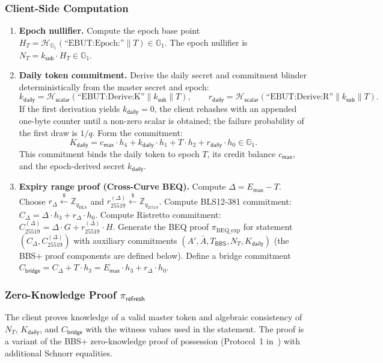 \documentclass[11pt]{article}
\theoremstyle{definitionstyle}
\theoremstyle{plain}
\begin{document}
\subsubsection{Client-Side Computation}
\begin{enumerate}[leftmargin=*]
\item \textbf{Epoch nullifier.}
  Compute the epoch base point $H_T = \mathcal{H}_{\mathbb{G}_1}(\text{``EBUT:Epoch:''} \parallel T) \in \mathbb{G}_1$.
  The epoch nullifier is $N_T = k_{\mathsf{sub}} \cdot H_T \in \mathbb{G}_1$.
\item \textbf{Daily token commitment.}
  Derive the daily secret and commitment blinder deterministically from the master secret and epoch:
  \[
  k_{\mathsf{daily}} = \mathcal{H}_{\mathsf{scalar}}(\text{``EBUT:Derive:K''} \parallel k_{\mathsf{sub}} \parallel T),
  \qquad
  r_{\mathsf{daily}} = \mathcal{H}_{\mathsf{scalar}}(\text{``EBUT:Derive:R''} \parallel k_{\mathsf{sub}} \parallel T).
  \]
  If the first derivation yields $k_{\mathsf{daily}}=0$, the client rehashes with an appended one-byte counter until a non-zero scalar is obtained; the failure probability of the first draw is $1/q$. Form the commitment:
  \[
  K_{\mathsf{daily}} = c_{\mathsf{max}} \cdot h_4 + k_{\mathsf{daily}} \cdot h_1 + T \cdot h_2 + r_{\mathsf{daily}} \cdot h_0 \in \mathbb{G}_1.
  \]
  This commitment binds the daily token to epoch $T$, its credit balance $c_{\mathsf{max}}$, and the epoch-derived secret $k_{\mathsf{daily}}$.

\item \textbf{Expiry range proof (Cross-Curve BEQ).}
  Compute $\Delta = E_{\mathsf{max}} - T$.
  Choose $r_{\Delta} \xleftarrow{\$} \mathbb{Z}_{q_{\text{BLS}}}$ and $r_{25519}^{(\Delta)} \xleftarrow{\$} \mathbb{Z}_{q_{25519}}$.
  Compute BLS12-381 commitment: $C_{\Delta} = \Delta \cdot h_3 + r_{\Delta} \cdot h_0$.
  Compute Ristretto commitment: $C_{25519}^{(\Delta)} = \Delta \cdot G + r_{25519}^{(\Delta)} \cdot H$.
  Generate the BEQ proof $\pi_{\text{BEQ\_exp}}$ for statement $(C_{\Delta}, C_{25519}^{(\Delta)})$ with auxiliary commitments $(A', \bar{A}, T_{\mathsf{BBS}}, N_T, K_{\mathsf{daily}})$ (the BBS+ proof components are defined below).
  Define a bridge commitment $C_{\mathsf{bridge}} = C_{\Delta} + T \cdot h_3 = E_{\mathsf{max}} \cdot h_3 + r_{\Delta} \cdot h_0$.
\end{enumerate}

\subsubsection[Zero-Knowledge Proof pi refresh]{Zero-Knowledge Proof $\pi_{\mathsf{refresh}}$}
The client proves knowledge of a valid master token and algebraic consistency of $N_T$, $K_{\mathsf{daily}}$, and $C_{\mathsf{bridge}}$ with the witness values used in the statement. The proof is a variant of the BBS+ zero-knowledge proof of possession (Protocol~1 in~\cite{act}) with additional Schnorr equalities.
\end{document}
